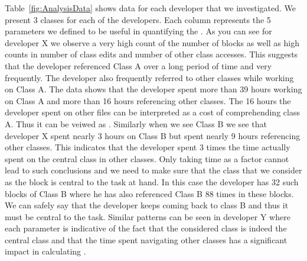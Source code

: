 Table~\ref{fig:AnalysisData} shows data for each developer that we investigated. We present 3 classes for each of the developers. Each column represents the 5 parameters we defined to be useful in quantifying the \TD. As you can see for developer X we observe a very high count of the number of blocks as well as high counts in number of class edits and number of other class accesses. This suggests that the developer referenced Class A over a long period of time and very frequently. The developer also frequently referred to other classes while working on Class A. The data shows that the developer spent more than 39 hours working on Class A and more than 16 hours referencing other classes. The 16 hours the developer spent on other files can be interpreted as a cost of comprehending class A. Thus it can be veiwed as  \TD. Similarly when we see Class B we see that developer X spent nearly 3 hours on Class B but spent nearly 9 hours referencing other classes. This indicates that the developer spent 3 times the time actually spent on the central class in other classes. Only taking time as a factor cannot lead to such conclusions and we need to make sure that the class that we consider as the block is central to the task at hand. In this case the developer has 32 such blocks of Class B where he has also referenced Class B 88 times in these blocks. We can safely say that the developer keeps coming back to class B and thus it must be central to the task. Similar patterns can be seen in developer Y where each parameter is indicative of the fact that the considered class is indeed the central class and that the time spent navigating other classes has a significant impact in calculating \TD.

